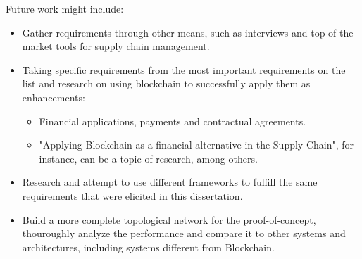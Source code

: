Future work might include:
\begin{itemize}
	\item Gather requirements through other means, such as interviews and top-of-the-market tools for supply chain management.
	\item Taking specific requirements from the most important requirements on the list and research on using blockchain to successfully apply them as enhancements:
	\begin{itemize}
		\item Financial applications, payments and contractual agreements.
		\item "Applying Blockchain as a financial alternative in the Supply Chain", for instance, can be a topic of research, among others.
	\end{itemize}
	\item Research and attempt to use different frameworks to fulfill the same requirements that were elicited in this dissertation.
	\item Build a more complete topological network for the proof-of-concept, thouroughly analyze the performance and compare it to other systems and architectures, including systems different from Blockchain.
	
\end{itemize} 


%


